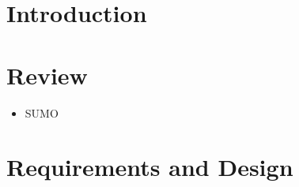 

\section{Introduction}

\begin{itemize}
	
\end{itemize}

\section{Review}

\begin{itemize}
    \item SUMO
\end{itemize}

\section{Requirements and Design}

